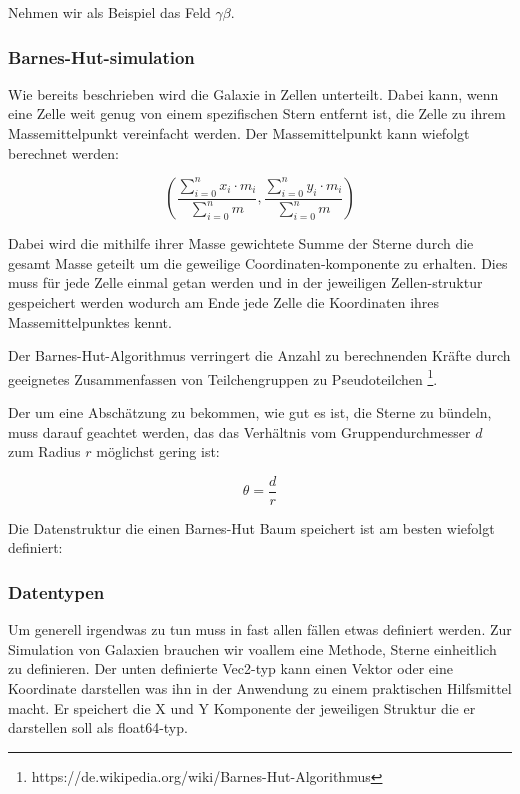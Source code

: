 \documentclass[a4paper, 10pt]{article}
\begin{document}
\begin{multicols*}{2}
Nehmen wir als Beispiel das Feld \( \gamma \beta \).

\subsubsection{Barnes-Hut-simulation}
Wie bereits beschrieben wird die Galaxie in Zellen unterteilt. Dabei kann, wenn
eine Zelle weit genug von einem spezifischen Stern entfernt ist, die Zelle zu
ihrem Massemittelpunkt vereinfacht werden. Der Massemittelpunkt kann wiefolgt
berechnet werden:

\begin{equation}
\left( \frac{ \sum_{i=0}^{n} x_i \cdot m_i }{ \sum_{i=0}^{n} m},
\frac{ \sum_{i=0}^{n} y_i \cdot m_i }{ \sum_{i=0}^{n} m } \right)
\end{equation}

Dabei wird die mithilfe ihrer Masse gewichtete Summe der Sterne durch die
gesamt Masse geteilt um die geweilige Coordinaten-komponente zu erhalten.  Dies
muss für jede Zelle einmal getan werden und in der jeweiligen Zellen-struktur
gespeichert werden wodurch am Ende jede Zelle die Koordinaten ihres
Massemittelpunktes kennt.

Der Barnes-Hut-Algorithmus verringert die Anzahl zu berechnenden Kräfte durch
geeignetes Zusammenfassen von Teilchengruppen zu Pseudoteilchen
\footnote{https://de.wikipedia.org/wiki/Barnes-Hut-Algorithmus}. 

Der um eine Abschätzung zu bekommen, wie gut es ist, die Sterne zu bündeln,
muss darauf geachtet werden, das das Verhältnis vom Gruppendurchmesser \( d \)
zum Radius \( r \) möglichst gering ist:

\begin{equation} \label{theta} \theta = \frac{d}{r} \end{equation}

Die Datenstruktur die einen Barnes-Hut Baum speichert ist am besten wiefolgt
definiert:

\subsubsection{Datentypen}
Um generell irgendwas zu tun muss in fast allen fällen etwas definiert werden.
Zur Simulation von Galaxien brauchen wir voallem eine Methode, Sterne
einheitlich zu definieren. Der unten definierte Vec2-typ kann einen Vektor oder
eine Koordinate darstellen was ihn in der Anwendung zu einem praktischen
Hilfsmittel macht.  Er speichert die X und Y Komponente der jeweiligen Struktur
die er darstellen soll als float64-typ. 


\end{multicols*}
\end{document}
